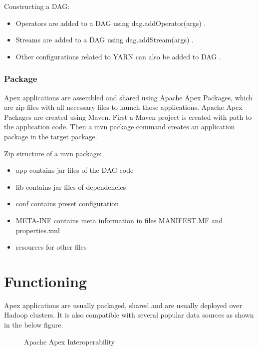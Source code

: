 \documentclass[9pt,twocolumn,twoside]{styles/osajnl}
\begin{document}
Constructing a DAG:
\begin{itemize}
  \item Operators are added to a DAG using dag.addOperator(args) \cite{ww-apacheapexinslideshare}.
  \item Streams are added to a DAG using dag.addStream(args) \cite{ww-apacheapexinslideshare}.
  \item Other configurations related to YARN can also be added to DAG \cite{ww-apacheapexinslideshare}. 
  
\end{itemize}
\subsubsection{Package}
Apex applications are assembled and shared using Apache Apex Packages, which are zip files with all necessary files to launch those applications.
Apache Apex Packages are created using Maven.                 
First a Maven project is created with path to the application code. 
Then a mvn package command creates an application package in the target package.


Zip structure of a mvn package:
\begin{itemize}
  \item app contains jar files of the DAG code
  \item lib contains jar files of dependencies
  \item conf contains preset configuration
  \item  META-INF contains meta information in files MANIFEST.MF and properties.xml
   \item resources for other files
\end{itemize}


\section{Functioning}
Apex applications are usually packaged, shared and are usually deployed over Hadoop clusters. It is also compatible with several popular data sources as shown in the below figure.
\begin{figure}[ht!]
\centering
{}
\caption{Apache Apex Interoperability\cite{www-apacheapexblog}}
\label{fig:Apache Apex Interoperability}
\end{figure}
\end{document}
